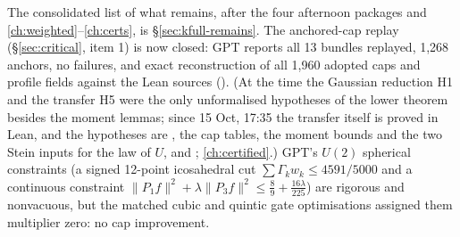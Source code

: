 The consolidated list of what remains, after the four afternoon packages and \autoref{ch:weighted}--\autoref{ch:certs}, is \S\ref{sec:kfull-remains}.
The anchored-cap replay (\S\ref{sec:critical}, item 1) is now closed: GPT reports all 13 bundles replayed, 1,268 anchors, no failures, and exact reconstruction of all 1,960 adopted caps
and profile fields against the Lean sources (). (At the time the Gaussian reduction H1 and the transfer H5 were the only unformalised hypotheses of the lower theorem besides the
moment lemmas; since 15 Oct, 17:35 the transfer itself is proved in Lean, and the hypotheses are , the cap tables, the moment bounds and the two Stein inputs for the law of $U$, and ; \autoref{ch:certified}.) GPT's $U(2)$ spherical constraints (a signed 12-point icosahedral cut $\sum\Gamma_kw_k\le4591/5000$ and a continuous constraint $\|P_1f\|^2+\lambda\|P_3f\|^2\le\frac89+\frac{16\lambda}{225}$)
are rigorous and nonvacuous, but the matched cubic and quintic gate optimisations assigned them multiplier zero: no cap improvement.
